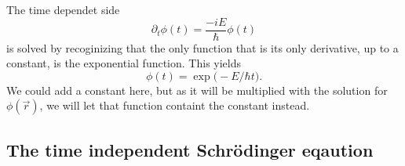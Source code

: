 \documentclass{article}
\begin{document}
        The time dependet side 
        \begin{equation*}
            \partial_t \phi(t) = \frac{-iE}{\hbar}\phi(t)
        \end{equation*}
        is solved by recoginizing that the only function that is its only derivative, up to a constant, is the exponential function. This yields
        \begin{equation*}
            \phi(t) = \exp \big(- E/\hbar t\big).
        \end{equation*}
        We could add a constant here, but as it will be multiplied with the solution for \(\phi(\vec r)\), we will let that function containt the constant instead.

    \subsection*{The time independent Schrödinger eqaution}
\end{document}
